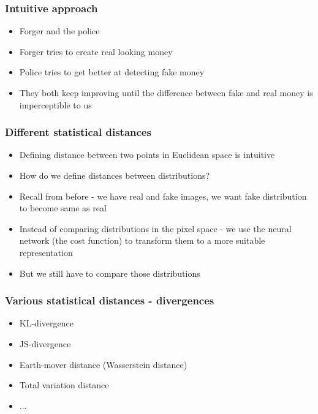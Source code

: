 \documentclass{beamer}
\begin{document}
\begin{frame}
	\frametitle{Intuitive approach}
	\begin{itemize}
		\item Forger and the police
		\item Forger tries to create real looking money
		\item Police tries to get better at detecting fake money
		\item They both keep improving until the difference between fake and real money is imperceptible to us
	\end{itemize}
\end{frame}
\begin{frame}
	\frametitle{Different statistical distances}
	\begin{itemize}
		\item Defining distance between two points in Euclidean space is intuitive
		\item How do we define distances between distributions?
		\item Recall from before - we have real and fake images, we want fake distribution to become same as real
		\item Instead of comparing distributions in the pixel space - we use the neural network (the cost function) to transform them to a more suitable representation
		\item But we still have to compare those distributions
	\end{itemize}
\end{frame}
\begin{frame}
	\frametitle{Various statistical distances - divergences}
	\begin{itemize}
		\item KL-divergence
		\item JS-divergence
		\item Earth-mover distance (Wasserstein distance)
		\item Total variation distance
		\item ...
	\end{itemize}
\end{frame}
\end{document}
